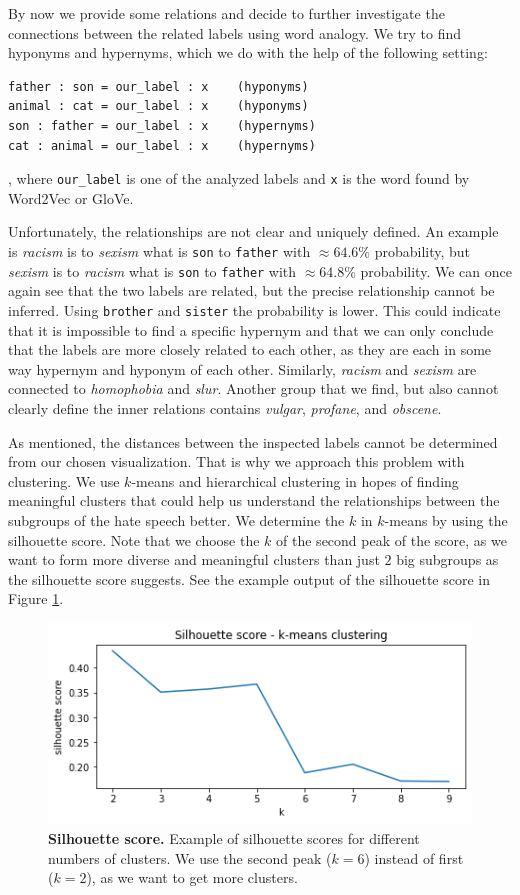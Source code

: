 \documentclass[fleqn,moreauthors,10pt]{ds_report}
\begin{document}
By now we provide some relations and decide to further investigate the connections between the related labels using word analogy. We try to find hyponyms and hypernyms, which we do with the help of the following setting:
\begin{verbatim}
father : son = our_label : x 	(hyponyms)
animal : cat = our_label : x 	(hyponyms)
son : father = our_label : x 	(hypernyms)
cat : animal = our_label : x 	(hypernyms)
\end{verbatim},
where \texttt{our\_label} is one of the analyzed labels and \texttt{x} is the word found by Word2Vec or GloVe. 

Unfortunately, the relationships are not clear and uniquely defined. An example is \textit{racism} is to \textit{sexism} what is \texttt{son} to \texttt{father} with $\approx 64.6\%$ probability, but \textit{sexism} is to \textit{racism} what is \texttt{son} to \texttt{father} with $\approx 64.8\%$ probability. We can once again see that the two labels are related, but the precise relationship cannot be inferred. Using \texttt{brother} and \texttt{sister} the probability is lower. This could indicate that it is impossible to find a specific hypernym and that we can only conclude that the labels are more closely related to each other, as they are each in some way hypernym and hyponym of each other. Similarly, \textit{racism} and \textit{sexism} are connected to \textit{homophobia} and \textit{slur}. Another group that we find, but also cannot clearly define the inner relations contains \textit{vulgar}, \textit{profane}, and \textit{obscene}.

As mentioned, the distances between the inspected labels cannot be determined from our chosen visualization. That is why we approach this problem with clustering. We use $k$-means and hierarchical clustering in hopes of finding meaningful clusters that could help us understand the relationships between the subgroups of the hate speech better. We determine the $k$ in $k$-means by using the silhouette score. Note that we choose the $k$ of the second peak of the score, as we want to form more diverse and meaningful clusters than just $2$ big subgroups as the silhouette score suggests. See the example output of the silhouette score in Figure \ref{fig:silh}.

\begin{figure}[htb]\centering
	\includegraphics[width=\linewidth]{silh.png}
	\caption{\textbf{Silhouette score.} Example of silhouette scores for different numbers of clusters. We use the second peak ($k = 6$) instead of first ($k = 2$), as we want to get more clusters.}
	\label{fig:silh}
\end{figure}
\end{document}
